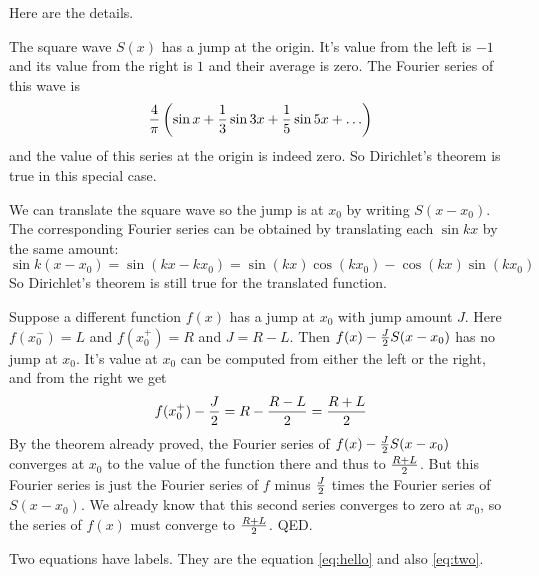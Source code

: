 \documentclass[11pt, oneside]{article}   	%
\begin{document}
Here are the details. 

The square wave $S(x)$ has a jump at the origin. It's value from the left is $-1$ and its value from the right is $1$ and their average is zero. The Fourier series of this wave is
\[{4 \over \pi} \left( \sin x + {1 \over 3} \sin 3x + {1 \over 5} \sin 5x + \ldots \right)\]
and the value of this series at the origin is indeed zero. So Dirichlet's theorem is true in this special case.

We can translate the square wave so the jump is at $x_0$ by writing $S(x - x_0)$. The corresponding Fourier series can be obtained by translating each $\sin kx$ by the same amount: 
\[\sin k(x - x_0) = \sin (kx - k x_0) = \sin(kx) \cos (k x_0) - \cos(kx) \sin(k x_0)\] So Dirichlet's theorem is still true for the translated function.

Suppose a different function $f(x)$ has a jump at $x_0$ with jump amount $J$. Here $f(x_0^-) = L$ and
$f(x_0^+) = R$ and $J = R - L$. Then $f(x) - {J \over 2} S(x - x_0)$ has no jump at $x_0$. It's value at $x_0$
can be computed from either the left or the right, and from the right we get \[f(x_0^+) - {J \over 2} = R - {{R - L} \over 2} = {{R + L} \over 2}\]
By the theorem already proved, the Fourier series of $f(x) - {J \over 2} S(x - x_0)$ converges at $x_0$ to the value of the function there and thus to ${{R + L} \over 2}$. But this Fourier series is just the Fourier series of $f$ minus ${J \over 2}$ times the Fourier series of $S(x - x_0)$. We already know that this second series converges to zero at $x_0$,  so the series of $f(x)$ must converge to ${{R + L} \over 2}$. QED. 

Two equations have labels. They are the equation \ref{eq:hello} and also \eqref{eq:two}.
\end{document}

